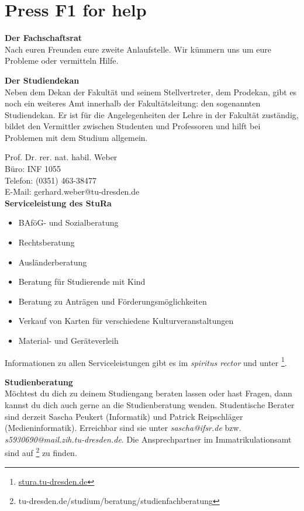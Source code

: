 \chapter{Press F1 for help}

\textbf{Der Fachschaftsrat} \\
Nach euren Freunden eure zweite Anlaufstelle.
Wir kümmern uns um eure Probleme oder vermitteln Hilfe.

\textbf{Der Studiendekan} \\
Neben dem Dekan der Fakultät und seinem Stellvertreter, dem Prodekan, gibt es noch ein weiteres Amt innerhalb der Fakultätsleitung:
den sogenannten Studiendekan.
Er ist für die Angelegenheiten der Lehre in der Fakultät zuständig, bildet den Vermittler zwischen Studenten und Professoren und hilft bei Problemen mit dem Studium allgemein.

Prof. Dr. rer. nat. habil. Weber \\
Büro: INF 1055 \\
Telefon: (0351) 463-38477 \\
E-Mail: gerhard.weber@tu-dresden.de \\

\textbf{Serviceleistung des StuRa} \\
\begin{itemize}
\item BAföG- und Sozialberatung
\item Rechtsberatung
\item Ausländerberatung
\item Beratung für Studierende mit Kind
\item Beratung zu Anträgen und Förderungsmöglichkeiten
\item Verkauf von Karten für verschiedene Kulturveranstaltungen
\item Material- und Geräteverleih
\end{itemize}

Informationen zu allen Serviceleistungen gibt es im \textit{spiritus rector} und unter \footnote{\url{stura.tu-dresden.de}}.

\textbf{Studienberatung} \\
Möchtest du dich zu deinem Studiengang beraten lassen oder hast Fragen, dann kannst du dich auch gerne an die Studienberatung wenden.
Studentische Berater sind derzeit Sascha Peukert (Informatik) und Patrick Reipschläger (Medieninformatik).
Erreichbar sind sie unter \textit{sascha@ifsr.de} bzw. \textit{s5930690@mail.zih.tu-dresden.de}.
Die Ansprechpartner im Immatrikulationsamt sind auf \footnote{tu-dresden.de/studium/beratung/studienfachberatung} zu finden.

